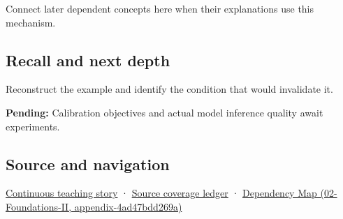 Connect later dependent concepts here when their explanations use this mechanism.

\subsection{Recall and next depth}\label{recall-and-next-depth}

Reconstruct the example and identify the condition that would invalidate it.

\textbf{Pending:} Calibration objectives and actual model inference quality await experiments.

\subsection{Source and navigation}\label{source-and-navigation}

\href{Continuous\%20Notes/Computing\%20Foundations\%20-\%20From\%20Bits\%20to\%20C++\%20and\%20Systems\%20APIs\#Choosing\%20what\%20information\%20to\%20keep}{Continuous teaching story} · \hyperref[appendix-fd090d982a15]{Source coverage ledger} · \href{}{Dependency Map (02-Foundations-II, appendix-4ad47bdd269a)}

